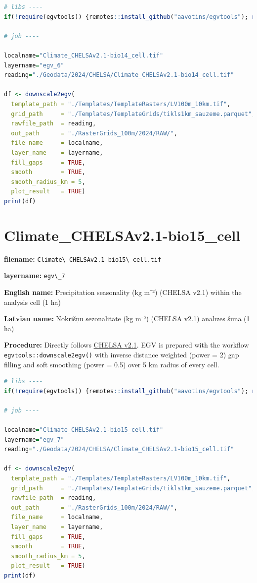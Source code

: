 \documentclass[
]{book}
\newcommand{\passthrough}[1]{#1}
\begin{document}
\begin{lstlisting}[language=R]
# libs ----
if(!require(egvtools)) {remotes::install_github("aavotins/egvtools"); require(egvtools)}

# job ----

localname="Climate_CHELSAv2.1-bio14_cell.tif"
layername="egv_6"
reading="./Geodata/2024/CHELSA/Climate_CHELSAv2.1-bio14_cell.tif"

df <- downscale2egv(
  template_path = "./Templates/TemplateRasters/LV100m_10km.tif",
  grid_path     = "./Templates/TemplateGrids/tikls1km_sauzeme.parquet",
  rawfile_path  = reading,
  out_path      = "./RasterGrids_100m/2024/RAW/",
  file_name     = localname,
  layer_name    = layername,
  fill_gaps     = TRUE,
  smooth        = TRUE,
  smooth_radius_km = 5,
  plot_result   = TRUE)
print(df)
\end{lstlisting}

\section{Climate\_CHELSAv2.1-bio15\_cell}\label{ch06.007}

\textbf{filename:} \passthrough{\lstinline!Climate\_CHELSAv2.1-bio15\_cell.tif!}

\textbf{layername:} \passthrough{\lstinline!egv\_7!}

\textbf{English name:} Precipitation seasonality (kg m⁻²) (CHELSA v2.1) within the analysis cell (1 ha)

\textbf{Latvian name:} Nokrišņu sezonalitāte (kg m⁻²) (CHELSA v2.1) analīzes šūnā (1 ha)

\textbf{Procedure:} Directly follows \hyperref[Ch04.11]{CHELSA v2.1}. EGV is prepared with the
workflow \passthrough{\lstinline!egvtools::downscale2egv()!} with inverse distance weighted (power = 2)
gap filling and soft smoothing (power = 0.5) over 5 km radius of every cell.

\begin{lstlisting}[language=R]
# libs ----
if(!require(egvtools)) {remotes::install_github("aavotins/egvtools"); require(egvtools)}

# job ----

localname="Climate_CHELSAv2.1-bio15_cell.tif"
layername="egv_7"
reading="./Geodata/2024/CHELSA/Climate_CHELSAv2.1-bio15_cell.tif"

df <- downscale2egv(
  template_path = "./Templates/TemplateRasters/LV100m_10km.tif",
  grid_path     = "./Templates/TemplateGrids/tikls1km_sauzeme.parquet",
  rawfile_path  = reading,
  out_path      = "./RasterGrids_100m/2024/RAW/",
  file_name     = localname,
  layer_name    = layername,
  fill_gaps     = TRUE,
  smooth        = TRUE,
  smooth_radius_km = 5,
  plot_result   = TRUE)
print(df)
\end{lstlisting}
\end{document}
